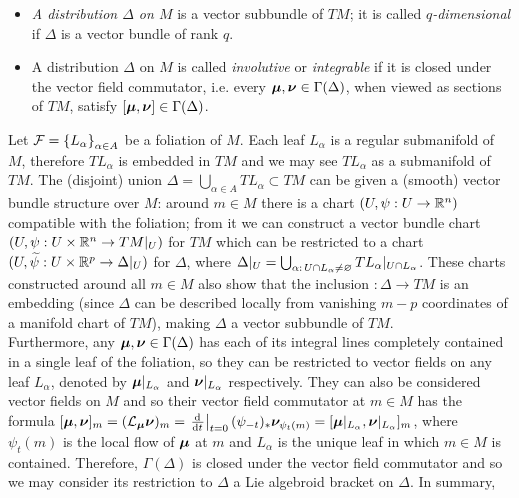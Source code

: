 \begin{definition}
\begin{itemize}
    \item \emph{A distribution $\Delta$ on $M$} is a vector subbundle of $TM$; it is called \emph{$q$-dimensional} if $\Delta$ is a vector bundle of rank $q$.
    
    \item A distribution $\Delta$ on $M$ is called \emph{involutive} or \emph{integrable} if it is closed under the vector field commutator, i.e. every $\bm{\mu}, \bm{\nu} \in \Gamma(\Delta)$, when viewed as sections of $TM$, satisfy $[\bm{\mu}, \bm{\nu}] \in \Gamma(\Delta)$.
\end{itemize}
\end{definition}

Let $\mathcal F = \left\{ L_\alpha \right\}_{\alpha \in A}$ be a foliation of $M$. Each leaf $L_\alpha$ is a regular submanifold of $M$, therefore $T L_\alpha$ is embedded in $TM$ and we may see $T L_\alpha$ as a submanifold of $TM$. The (disjoint) union $\Delta = \bigcup_{\alpha \in A} T L_\alpha \subset TM$ can be given a (smooth) vector bundle structure over $M$: around $m \in M$ there is a chart $(U, \psi:U \to \mathbb{R}^n)$ compatible with the foliation; from it we can construct a vector bundle chart $(U, \psi: U \times \mathbb{R}^n \to TM|_{U})$ for $TM$ which can be restricted to a chart $(U, \widetilde{\psi}: U \times \mathbb{R}^p \to \Delta|_{U})$ for $\Delta$, where $\Delta|_U = \bigcup_{\alpha: \, U \cap L_\alpha \neq \varnothing} T L_\alpha|_{U\cap L_\alpha}$. These charts constructed around all $m\in M$ also show that the inclusion $:\Delta \to TM$ is an embedding (since $\Delta$ can be described locally from vanishing $m-p$ coordinates of a manifold chart of $TM$), making $\Delta$ a vector subbundle of $TM$.
\\
Furthermore, any $\bm{\mu}, \bm{\nu} \in \Gamma(\Delta)$ has each of its integral lines completely contained in a single leaf of the foliation, so they can be restricted to vector fields on any leaf $L_\alpha$, denoted by $\bm{\mu}|_{L_\alpha}$ and $\bm{\nu}|_{L_\alpha}$ respectively. They can also be considered vector fields on $M$ and so their vector field commutator at $m \in M$ has the formula $[\sect \mu, \sect \nu]_m = (\mathcal L_{\sect \mu} \sect \nu)_m = \der{t}[t = 0] (\psi_{-t})_* \sect \nu_{\psi_t(m)} = [\sect \mu|_{L_\alpha}, \sect \nu|_{L_\alpha}]_m$, where $\psi_t(m)$ is the local flow of $\bm{\mu}$ at $m$ and $L_\alpha$ is the unique leaf in which $m \in M$ is contained. Therefore, $\Gamma(\Delta)$ is closed under the vector field commutator and so we may consider its restriction to $\Delta$ a Lie algebroid bracket on $\Delta$. In summary, 

